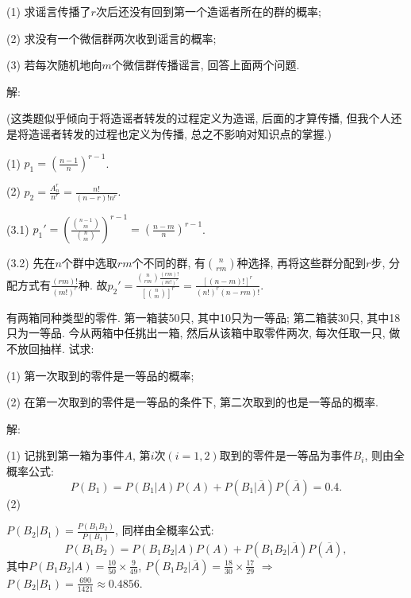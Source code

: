 \documentclass[standard]{ExBook}
\begin{document}
\begin{qitems}
\begin{bbox}
\begin{shaded}
(1) 求谣言传播了$r$次后还没有回到第一个造谣者所在的群的概率;

(2) 求没有一个微信群两次收到谣言的概率;

(3) 若每次随机地向$m$个微信群传播谣言, 回答上面两个问题.
    \end{shaded}
    \end{bbox}

\vspace{-5em}

    \begin{bbox}
解: 

(这类题似乎倾向于将造谣者转发的过程定义为造谣, 后面的才算传播, 但我个人还是将造谣者转发的过程也定义为传播, 总之不影响对知识点的掌握.)

(1) $p_{1}=(\frac{n-1}{n})^{r-1}$.

(2) $p_{2}=\frac{A_{n}^{r}}{n^r}=\frac{n!}{(n-r)!n^r}$.

(3.1) $p_{1}'=(\frac{\binom{n-1}{m}}{\binom{n}{m}})^{r-1}=(\frac{n-m}{n})^{r-1}$.

(3.2) 先在$n$个群中选取$rm$个不同的群, 有$\binom{n}{rm}$种选择, 再将这些群分配到$r$步, 分配方式有$\frac{(rm)!}{(m!)^{r}}$种. 故$p_{2}'=\displaystyle\frac{\binom{n}{rm}\frac{(rm)!}{(m!)^{r}}}{[\binom{n}{m}]^{r}}=\frac{[(n-m)!]^{r}}{(n!)^r(n-rm)!}$.
    \end{bbox}

\vspace{-5em}

    \begin{bbox}
    \begin{shaded}
        \qitem
有两箱同种类型的零件. 第一箱装50只, 其中10只为一等品; 第二箱装30只, 其中18只为一等品. 今从两箱中任挑出一箱, 然后从该箱中取零件两次, 每次任取一只, 做不放回抽样. 试求:

(1) 第一次取到的零件是一等品的概率;

(2) 在第一次取到的零件是一等品的条件下, 第二次取到的也是一等品的概率.
    \end{shaded}
    \end{bbox}

\vspace{-5em}

    \begin{bbox}
解: 

(1) 记挑到第一箱为事件$A$, 第$i$次$(i=1,2)$取到的零件是一等品为事件$B_{i}$, 则由全概率公式:
$$P(B_{1})=P(B_{1}|A)P(A)+P(B_{1}|\overline{A})P(\overline{A})=0.4.$$
(2)

 $P(B_{2}|B_{1})=\frac{P(B_{1}B_{2})}{P(B_{1})}$, 同样由全概率公式:
$$P(B_{1}B_{2})=P(B_{1}B_{2}|A)P(A)+P(B_{1}B_{2}|\overline{A})P(\overline{A}),$$
其中$P(B_{1}B_{2}|A)=\frac{10}{50}\times\frac{9}{49}$, $P(B_{1}B_{2}|\overline{A})=\frac{18}{30}\times\frac{17}{29}$ $\Longrightarrow$ $P(B_{2}|B_{1})=\frac{690}{1421}\approx0.4856$.


\end{bbox}
\end{qitems}
\end{document}
